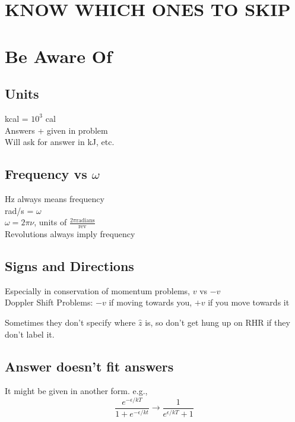 \documentclass[10pt,a4paper]{article}
\begin{document}
\section{KNOW WHICH ONES TO SKIP} %
\label{sec:know_which_ones_to_skip}

\section{Be Aware Of} %
\label{sec:units_to_be_aware_of}
\subsection{Units} %
\label{sub:units}
kcal = $10^3$ cal\\
Answers + given in problem\\
Will ask for answer in kJ, etc.

\subsection{Frequency vs $\omega$} %
\label{sub:freq}
Hz always means frequency\\
rad/s = $\omega$\\
$\omega = 2 \pi \nu$, units of $\frac{2\pi \textrm{radians} }{\textrm{rev}}$\\
Revolutions always imply frequency

\subsection{Signs and Directions} %
\label{sub:signs_and_directions}
Especially in conservation of momentum problems, $v$ vs $-v$\\
Doppler Shift Problems: $-v$ if moving towards you, $+v$ if you move towards it


Sometimes they don't specify where $\hat{z}$ is, so don't get hung up on RHR if they don't label it.\\
\subsection{Answer doesn't fit answers} %
\label{sub:answer_doesn_t_fit_answers}
It might be given in another form. e.g.,
\begin{equation}
    \frac{e^{-\epsilon/kT}}{1 + e^{-\epsilon/kt}} \rightarrow \frac{1}{e^{\epsilon/kT} + 1}
\end{equation}
\end{document}
